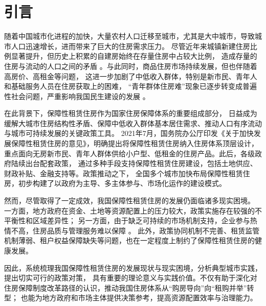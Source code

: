 \section{引言}

随着中国城市化进程的加快，大量农村人口迁移至城市，尤其是大中城市，导致城市人口迅速增长，进而带来了巨大的住房需求压力。
尽管近年来城镇新建住房比例显著提升，但历史上积累的自建房始终在存量住房中占较大比例，
造成存量的住房与流动的人口之间的矛盾 \cite{RN1}。与此同时，商品住房市场持续发展，但也伴随着高房价、高租金等问题，
这进一步加剧了中低收入群体，特别是新市民、青年人和基础服务人员在住房获取上的困难，
“青年群体住房难”现象已逐步转变成普遍性社会问题，严重影响我国民生建设的发展 \cite{RN2}。

在此背景下，保障性租赁住房作为国家住房保障体系的重要组成部分，
日益成为缓解大城市住房结构性矛盾、保障中低收入群体基本居住需求、推动人口有序流动与城市可持续发展的关键政策工具。
2021年7月，国务院办公厅印发《关于加快发展保障性租赁住房的意见》，明确提出将保障性租赁住房纳入住房体系顶层设计，
重点面向无房新市民、青年人群体供给小户型、低租金的住房产品。此后，各级政府陆续出台配套政策，
通过多种手段支持保障性租赁住房建设，包括土地供应、财政补贴、金融支持等。政策推动之下，
全国多个城市加快布局保障性租赁住房，初步构建了以政府为主导、多主体参与、市场化运作的建设模式。

然而，尽管取得了一定成效，我国保障性租赁住房的发展仍面临诸多现实困境。
一方面，地方政府在资金、土地等资源配置上的压力较大，政策实施存在较强的不平衡性和区域差异性；
另一方面，由于缺乏可持续的市场机制支持，企业参与热情不高，住房品质与管理服务难以保障 \cite{RN3} \cite{RN4}。
此外，政策协同机制不完善、租赁监管机制薄弱、租户权益保障缺失等问题，也在一定程度上制约了保障性租赁住房的健康发展。

因此，系统梳理我国保障性租赁住房的发展现状与现实困境，分析典型城市实践，提出切实可行的政策对策，
具有重要的理论意义与实践价值。不仅有助于深化对住房保障制度改革路径的认识，推动我国住房体系从“购房导向”向“租购并举”转型；
也能为地方政府和市场主体提供决策参考，提高资源配置效率与治理能力。


